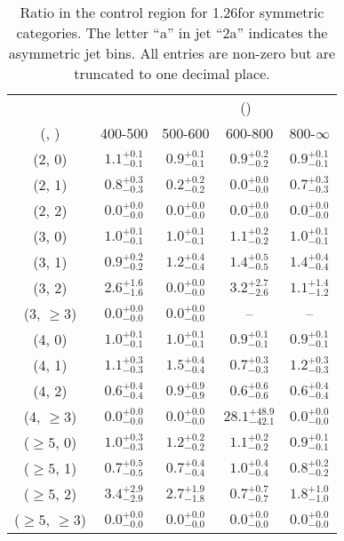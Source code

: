 \begin{table}[h!]
\tiny
\centering
\caption{Ratio in the \gj control region for 1.26\ifb for symmetric categories. The letter ``a'' in jet \eg ``2a''  indicates the asymmetric jet bins. All entries are non-zero but are truncated to one decimal place.\label{tab:ratiosep_ewk_gj_sym}}
\begin{tabular}
{ccccc}
	\hline\hline
&	& \multicolumn{4}{c}{\scalht (\gev)} \\ 
	 (\njet,  \nb) & 400-500 & 500-600 & 600-800 & 800-$\infty$ \\ [0.8ex] 
\hline
	(2, 0) & $1.1^{+ 0.1 }_{- 0.1 }$ & $0.9^{+ 0.1 }_{- 0.1 }$ & $0.9^{+ 0.2 }_{- 0.2 }$ & $0.9^{+ 0.1 }_{- 0.1 }$ \\[0.5ex] 
	(2, 1) & $0.8^{+ 0.3 }_{- 0.3 }$ & $0.2^{+ 0.2 }_{- 0.2 }$ & $0.0^{+ 0.0 }_{- 0.0 }$ & $0.7^{+ 0.3 }_{- 0.3 }$ \\[0.5ex] 
	(2, 2) & $0.0^{+ 0.0 }_{- 0.0 }$ & $0.0^{+ 0.0 }_{- 0.0 }$ & $0.0^{+ 0.0 }_{- 0.0 }$ & $0.0^{+ 0.0 }_{- 0.0 }$ \\[0.5ex] 
	(3, 0) & $1.0^{+ 0.1 }_{- 0.1 }$ & $1.0^{+ 0.1 }_{- 0.1 }$ & $1.1^{+ 0.2 }_{- 0.2 }$ & $1.0^{+ 0.1 }_{- 0.1 }$ \\[0.5ex] 
	(3, 1) & $0.9^{+ 0.2 }_{- 0.2 }$ & $1.2^{+ 0.4 }_{- 0.4 }$ & $1.4^{+ 0.5 }_{- 0.5 }$ & $1.4^{+ 0.4 }_{- 0.4 }$ \\[0.5ex] 
	(3, 2) & $2.6^{+ 1.6 }_{- 1.6 }$ & $0.0^{+ 0.0 }_{- 0.0 }$ & $3.2^{+ 2.7 }_{- 2.6 }$ & $1.1^{+ 1.4 }_{- 1.2 }$ \\[0.5ex] 
	(3, $\ge3$) & $0.0^{+ 0.0 }_{- 0.0 }$ & $0.0^{+ 0.0 }_{- 0.0 }$ & -- & -- \\[0.5ex] 
	(4, 0) & $1.0^{+ 0.1 }_{- 0.1 }$ & $1.0^{+ 0.1 }_{- 0.1 }$ & $0.9^{+ 0.1 }_{- 0.1 }$ & $0.9^{+ 0.1 }_{- 0.1 }$ \\[0.5ex] 
	(4, 1) & $1.1^{+ 0.3 }_{- 0.3 }$ & $1.5^{+ 0.4 }_{- 0.4 }$ & $0.7^{+ 0.3 }_{- 0.3 }$ & $1.2^{+ 0.3 }_{- 0.3 }$ \\[0.5ex] 
	(4, 2) & $0.6^{+ 0.4 }_{- 0.4 }$ & $0.9^{+ 0.9 }_{- 0.9 }$ & $0.6^{+ 0.6 }_{- 0.6 }$ & $0.6^{+ 0.4 }_{- 0.4 }$ \\[0.5ex] 
	(4, $\ge3$) & $0.0^{+ 0.0 }_{- 0.0 }$ & $0.0^{+ 0.0 }_{- 0.0 }$ & $28.1^{+ 48.9 }_{- 42.1 }$ & $0.0^{+ 0.0 }_{- 0.0 }$ \\[0.5ex] 
	($\ge5$, 0) & $1.0^{+ 0.3 }_{- 0.3 }$ & $1.2^{+ 0.2 }_{- 0.2 }$ & $1.1^{+ 0.2 }_{- 0.2 }$ & $0.9^{+ 0.1 }_{- 0.1 }$ \\[0.5ex] 
	($\ge5$, 1) & $0.7^{+ 0.5 }_{- 0.5 }$ & $0.7^{+ 0.4 }_{- 0.4 }$ & $1.0^{+ 0.4 }_{- 0.4 }$ & $0.8^{+ 0.2 }_{- 0.2 }$ \\[0.5ex] 
	($\ge5$, 2) & $3.4^{+ 2.9 }_{- 2.9 }$ & $2.7^{+ 1.9 }_{- 1.8 }$ & $0.7^{+ 0.7 }_{- 0.7 }$ & $1.8^{+ 1.0 }_{- 1.0 }$ \\[0.5ex] 
	($\ge5$, $\ge3$) & $0.0^{+ 0.0 }_{- 0.0 }$ & $0.0^{+ 0.0 }_{- 0.0 }$ & $0.0^{+ 0.0 }_{- 0.0 }$ & $0.0^{+ 0.0 }_{- 0.0 }$ \\[0.5ex] 
	\hline
	\hline
\end{tabular}
\end{table}
